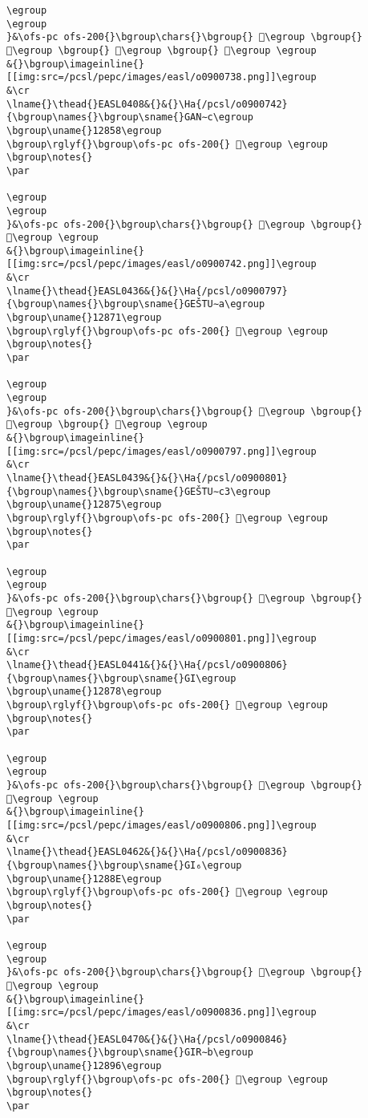 \begin{verbatim}
\egroup
\egroup
}&\ofs-pc ofs-200{}\bgroup\chars{}\bgroup{} 𒡔\egroup \bgroup{} 𒡕\egroup \bgroup{} 𒡖\egroup \bgroup{} 𒡗\egroup \egroup
&{}\bgroup\imageinline{}[[img:src=/pcsl/pepc/images/easl/o0900738.png]]\egroup
&\cr
\lname{}\thead{}EASL0408&{}&{}\Ha{/pcsl/o0900742}{\bgroup\names{}\bgroup\sname{}GAN∼c\egroup
\bgroup\uname{}12858\egroup
\bgroup\rglyf{}\bgroup\ofs-pc ofs-200{} 𒡘\egroup \egroup
\bgroup\notes{}
\par 

\egroup
\egroup
}&\ofs-pc ofs-200{}\bgroup\chars{}\bgroup{} 𒡘\egroup \bgroup{} 𒡠\egroup \egroup
&{}\bgroup\imageinline{}[[img:src=/pcsl/pepc/images/easl/o0900742.png]]\egroup
&\cr
\lname{}\thead{}EASL0436&{}&{}\Ha{/pcsl/o0900797}{\bgroup\names{}\bgroup\sname{}GEŠTU∼a\egroup
\bgroup\uname{}12871\egroup
\bgroup\rglyf{}\bgroup\ofs-pc ofs-200{} 𒡱\egroup \egroup
\bgroup\notes{}
\par 

\egroup
\egroup
}&\ofs-pc ofs-200{}\bgroup\chars{}\bgroup{} 𒡱\egroup \bgroup{} 𒡲\egroup \bgroup{} 𒡳\egroup \egroup
&{}\bgroup\imageinline{}[[img:src=/pcsl/pepc/images/easl/o0900797.png]]\egroup
&\cr
\lname{}\thead{}EASL0439&{}&{}\Ha{/pcsl/o0900801}{\bgroup\names{}\bgroup\sname{}GEŠTU∼c3\egroup
\bgroup\uname{}12875\egroup
\bgroup\rglyf{}\bgroup\ofs-pc ofs-200{} 𒡵\egroup \egroup
\bgroup\notes{}
\par 

\egroup
\egroup
}&\ofs-pc ofs-200{}\bgroup\chars{}\bgroup{} 𒡵\egroup \bgroup{} 𒡶\egroup \egroup
&{}\bgroup\imageinline{}[[img:src=/pcsl/pepc/images/easl/o0900801.png]]\egroup
&\cr
\lname{}\thead{}EASL0441&{}&{}\Ha{/pcsl/o0900806}{\bgroup\names{}\bgroup\sname{}GI\egroup
\bgroup\uname{}12878\egroup
\bgroup\rglyf{}\bgroup\ofs-pc ofs-200{} 𒡸\egroup \egroup
\bgroup\notes{}
\par 

\egroup
\egroup
}&\ofs-pc ofs-200{}\bgroup\chars{}\bgroup{} 𒢄\egroup \bgroup{} 𒡸\egroup \egroup
&{}\bgroup\imageinline{}[[img:src=/pcsl/pepc/images/easl/o0900806.png]]\egroup
&\cr
\lname{}\thead{}EASL0462&{}&{}\Ha{/pcsl/o0900836}{\bgroup\names{}\bgroup\sname{}GI₆\egroup
\bgroup\uname{}1288E\egroup
\bgroup\rglyf{}\bgroup\ofs-pc ofs-200{} 𒢎\egroup \egroup
\bgroup\notes{}
\par 

\egroup
\egroup
}&\ofs-pc ofs-200{}\bgroup\chars{}\bgroup{} 𒢏\egroup \bgroup{} 𒢎\egroup \egroup
&{}\bgroup\imageinline{}[[img:src=/pcsl/pepc/images/easl/o0900836.png]]\egroup
&\cr
\lname{}\thead{}EASL0470&{}&{}\Ha{/pcsl/o0900846}{\bgroup\names{}\bgroup\sname{}GIR∼b\egroup
\bgroup\uname{}12896\egroup
\bgroup\rglyf{}\bgroup\ofs-pc ofs-200{} 𒢖\egroup \egroup
\bgroup\notes{}
\par 


\end{verbatim}
